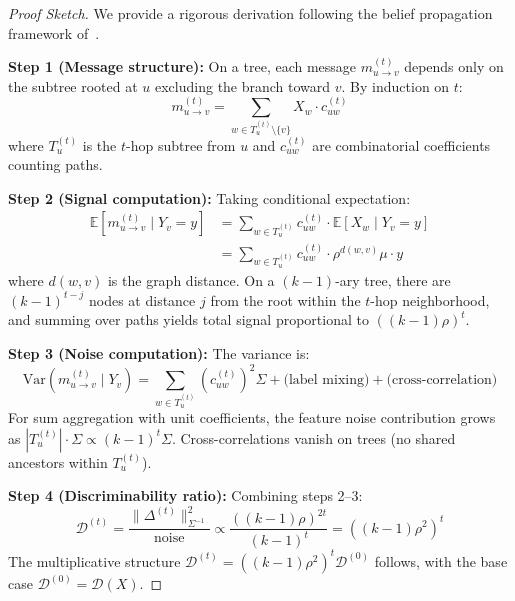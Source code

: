 \begin{proof}[Proof Sketch]
We provide a rigorous derivation following the belief propagation framework of~\cite{abbe2018community}.

\textbf{Step 1 (Message structure):} On a tree, each message $m_{u \to v}^{(t)}$ depends only on the subtree rooted at $u$ excluding the branch toward $v$. By induction on $t$:
\begin{equation}
    m_{u \to v}^{(t)} = \sum_{w \in T_u^{(t)} \setminus \{v\}} X_w \cdot c_{uw}^{(t)}
\end{equation}
where $T_u^{(t)}$ is the $t$-hop subtree from $u$ and $c_{uw}^{(t)}$ are combinatorial coefficients counting paths.

\textbf{Step 2 (Signal computation):} Taking conditional expectation:
\begin{align}
    \mathbb{E}[m_{u \to v}^{(t)} \mid Y_v = y] &= \sum_{w \in T_u^{(t)}} c_{uw}^{(t)} \cdot \mathbb{E}[X_w \mid Y_v = y] \\
    &= \sum_{w \in T_u^{(t)}} c_{uw}^{(t)} \cdot \rho^{d(w,v)} \mu \cdot y
\end{align}
where $d(w,v)$ is the graph distance. On a $(k-1)$-ary tree, there are $(k-1)^{t-j}$ nodes at distance $j$ from the root within the $t$-hop neighborhood, and summing over paths yields total signal proportional to $((k-1)\rho)^t$.

\textbf{Step 3 (Noise computation):} The variance is:
\begin{equation}
    \mathrm{Var}(m_{u \to v}^{(t)} \mid Y_v) = \sum_{w \in T_u^{(t)}} (c_{uw}^{(t)})^2 \Sigma + \text{(label mixing)} + \text{(cross-correlation)}
\end{equation}
For sum aggregation with unit coefficients, the feature noise contribution grows as $|T_u^{(t)}| \cdot \Sigma \propto (k-1)^t \Sigma$. Cross-correlations vanish on trees (no shared ancestors within $T_u^{(t)}$).

\textbf{Step 4 (Discriminability ratio):} Combining steps 2--3:
\begin{equation}
    \mathcal{D}^{(t)} = \frac{\|\Delta^{(t)}\|_{\Sigma^{-1}}^2}{\text{noise}} \propto \frac{((k-1)\rho)^{2t}}{(k-1)^t} = ((k-1)\rho^2)^t
\end{equation}
The multiplicative structure $\mathcal{D}^{(t)} = ((k-1)\rho^2)^t \mathcal{D}^{(0)}$ follows, with the base case $\mathcal{D}^{(0)} = \mathcal{D}(X)$.
\end{proof}

